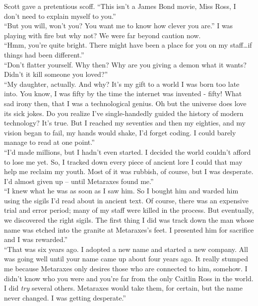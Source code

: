 \documentclass[a5paper]{scrartcl}
\begin{document}
Scott gave a pretentious scoff. \enquote{This isn't a James Bond movie, Miss Ross, I don't need to explain myself to you.}\\


\enquote{But you will, won't you? You want me to know how clever you are.} I was playing with fire but why not? We were far beyond caution now. \\


\enquote{Hmm, you're quite bright. There might have been a place for you on my staff\dots if things had been different.}\\


\enquote{Don't flatter yourself. Why then? Why are you giving a demon what it wants? Didn't it kill someone you loved?}\\


\enquote{My daughter, actually. And why? It's my gift to a world I was born too late into. You know, I was fifty by the time the internet was invented - fifty! What sad irony then, that I was a technological genius. Oh but the universe does love its sick jokes. Do you realize I've single-handedly guided the history of modern technology? It's true. But I reached my seventies and then my eighties, and my vision began to fail, my hands would shake, I'd forget coding. I could barely manage to read at one point.}\\


\enquote{I'd made millions, but I hadn't even started. I decided the world couldn't afford to lose me yet. So, I tracked down every piece of ancient lore I could that may help me reclaim my youth. Most of it was rubbish, of course, but I was desperate. I'd almost given up -- until Metaraxes found me.}\\


\enquote{I knew what he was as soon as I saw him. So I bought him and warded him using the sigils I'd read about in ancient text.  Of course, there was an expensive trial and error period; many of my staff were killed in the process. But eventually, we discovered the right sigils. The first thing I did was track down the man whose name was etched into the granite at Metaraxes's feet. I presented him for sacrifice and I was rewarded.}\\


\enquote{That was six years ago. I adopted a new name and started a new company. All was going well until your name came up about four years ago. It really stumped me because Metaraxes only desires those who are connected to him, somehow. I didn't know who you were and you're far from the only Caitlin Ross in the world. I did \textit{try}
 several others. Metaraxes would take them, for certain, but the name never changed. I was getting desperate.}\\
\end{document}
